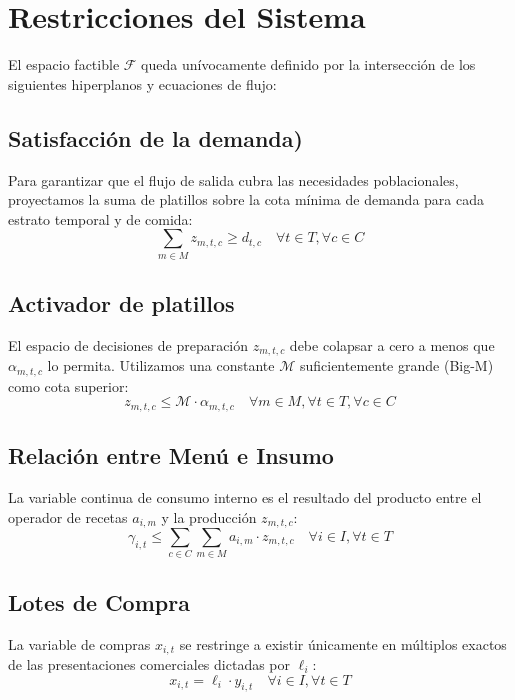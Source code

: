 \documentclass[12pt]{report}
\begin{document}
\section{Restricciones del Sistema}

El espacio factible $\mathcal{F}$ queda unívocamente definido por la intersección de los siguientes hiperplanos y ecuaciones de flujo:

\subsection{Satisfacción de la demanda)}
Para garantizar que el flujo de salida cubra las necesidades poblacionales, proyectamos la suma de platillos sobre la cota mínima de demanda para cada estrato temporal y de comida:
\begin{equation}
    \sum_{m \in M} z_{m,t,c} \ge d_{t,c} \quad \forall t \in T, \forall c \in C
\end{equation}

\subsection{Activador de platillos}
El espacio de decisiones de preparación $z_{m,t,c}$ debe colapsar a cero a menos que $\alpha_{m,t,c}$ lo permita. Utilizamos una constante $\mathcal{M}$ suficientemente grande (Big-M) como cota superior:
\begin{equation}
    z_{m,t,c} \le \mathcal{M} \cdot \alpha_{m,t,c} \quad \forall m \in M, \forall t \in T, \forall c \in C
\end{equation}

\subsection{Relación entre Menú e Insumo}
La variable continua de consumo interno es el resultado del producto entre el operador de recetas $a_{i,m}$ y la producción $z_{m,t,c}$:
\begin{equation}
    \gamma_{i,t} \le \sum_{c \in C} \sum_{m \in M} a_{i,m} \cdot z_{m,t,c} \quad \forall i \in I, \forall t \in T
\end{equation}

\subsection{Lotes de Compra}
La variable de compras $x_{i,t}$ se restringe a existir únicamente en múltiplos exactos de las presentaciones comerciales dictadas por $\ell_i$:
\begin{equation}
    x_{i,t} = \ell_i \cdot y_{i,t} \quad \forall i \in I, \forall t \in T
\end{equation}
\end{document}
